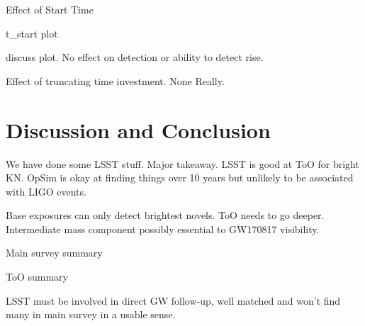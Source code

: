 Effect of Start Time

t_start plot

discuss plot. No effect on detection or ability to detect rise. 

Effect of truncating time investment. None Really.

\section{Discussion and Conclusion}
\label{sec:ch6_conc}
We have done some LSST stuff. Major takeaway. LSST is good at ToO for bright KN. OpSim is okay at finding things over 10 years but unlikely to be associated with LIGO events.

Base exposures can only detect brightest novels. ToO needs to go deeper. Intermediate mass component possibly essential to GW170817 visibility.

Main survey summary

ToO summary

LSST must be involved in direct GW follow-up, well matched and won't find many in main survey in a usable sense.

